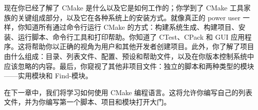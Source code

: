 现在你已经了解了 CMake 是什么以及它是如何工作的；你学到了 CMake 工具家族的关键组成部分，以及它在各种系统上的安装方式。就像真正的 power user 一样，你知道所有通过命令行运行 CMake 的方式：构建系统生成、构建项目、安装、运行脚本、命令行工具和打印帮助。你知道了 CTest、CPack 和 GUI 应用程序。这将帮助你以正确的视角为用户和其他开发者创建项目。此外，你了解了项目由什么组成：目录、列表文件、配置、预设和帮助文件，以及在你版本控制系统中应该忽略的内容。最后，你窥视了其他非项目文件：独立的脚本和两种类型的模块——实用模块和 Find-模块。

在下一章中，我们将学习如何使用 CMake 编程语言。这将允许你编写自己的列表文件，并为你编写第一个脚本、项目和模块打开大门。
